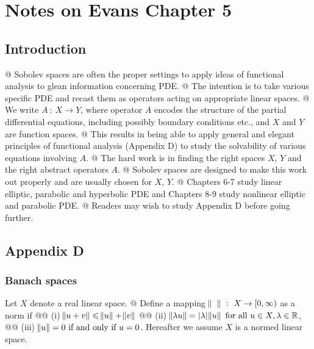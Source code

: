 \chapter{Notes on Evans Chapter 5}

\section{Introduction}
\beel[itemize]
@ Sobolev spaces are often the proper settings to apply ideas of functional
analysis to glean information concerning PDE.
@ The intention is to take various specific PDE and recast them as operators
acting on appropriate linear spaces.
@ We write $A~:~X\to Y$, where operator $A$ encodes the structure of the partial
differential equations, including possibly boundary conditions etc., and $X$ and
$Y$ are function spaces.
@ This results in being able to apply general and elegant principles of
functional analysis (Appendix D) to study the solvability of various equations
involving $A$.
@ The hard work is in finding the right spaces $X$, $Y$ and the right abstract
operators $A$.
@ Sobolev spaces are designed to make this work out properly and are usually
chosen for $X$, $Y$.
@ Chapters 6-7 study linear elliptic, parabolic and hyperbolic PDE and Chapters
8-9 study nonlinear elliptic and parabolic PDE.
@ Readers may wish to study Appendix D before going further.
\eeel

\newcommand{\seq}[1]{\ensuremath{\big\{#1_k\big\}_{k=1}^\infty}}
\newcommand{\subseq}[1]{\ensuremath{\big\{{#1_k}_j\big\}_{j=1}^\infty}}
\section{Appendix D}
\subsection{Banach spaces}
Let $X$ denote a real linear space.
\beeli
@ Define a mapping $\norm{\phantom{u}}~:~X\to[0,\infty)$ as a norm if
@@ (i) $\norm{u+v} \leqslant \norm{u}+\norm{v}$
@@ (ii) $\norm{\lambda u}=|\lambda|\norm{u}~\text{for all}~u\in X, \lambda\in \mathbb{R}$,
@@ (iii) $\norm{u} = 0~\text{if and only if}~u=0$.
Hereafter we assume $X$ is a normed linear space.

